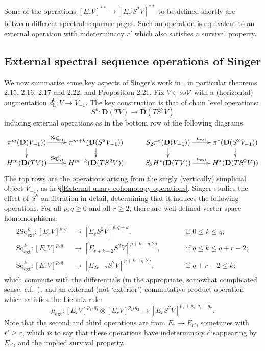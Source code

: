 \documentclass[11pt]{amsart} \renewcommand{\baselinestretch}{1.2}
\theoremstyle{plain}
\numberwithin{equation}{section} %
\theoremstyle{plain}
\numberwithin{equation}{chapter} %
\renewcommand{\to}{\longrightarrow}
\newcommand{\calV}{\mathcal{V}}
\newcommand{\vect}[2]{\calV^{#1}_{#2}}
\newcommand{\ExtCohOp}{\mathrm{Sq}_\mathrm{ext}}
\newcommand{\ExtCohProd}{\mu_\mathrm{ext}}
\newcommand{\Edown}[4]{[E_{#1}#2]^{#3}_{#4}}
\newcommand{\dhor}{_\mathrm{h}}
\newcommand{\dual}{\mathbf{D}}
\newcommand{\SubsectionOrSection}[1]{\subsection{#1}}
\begin{document}
\begin{Operations in composite functor spectral sequences}
Some of the operations $\Edown{r}{V}{**}{}\to \Edown{r'}{S^2V}{**}{}$ to be defined shortly are between different spectral sequence pages. 
Such an operation is equivalent to an external operation with indeterminacy $r'$ which also satisfies a survival property.

\SubsectionOrSection{External spectral sequence operations of Singer}\label{singer ext ops sect}
We now summarise some key aspects of Singer's work in \cite{MR2245560}, in particular theorems 2.15, 2.16, 2.17 and 2.22, and Proposition 2.21. Fix $V\in ss\vect{}{}$ with a (horizontal) augmentation $d\dhor^0:V\to V_{-1}$. The key construction is that of chain level operations:
\[S^k:\dual (TV)\to \dual (TS^2V)\]
inducing external operations as in the bottom row of the following diagrams:
\[\xymatrix@R=4mm{
\pi^{m}(\dual(V_{-1}))\ar[r]^-{\ExtCohOp^k}
\ar[d]%
&%
\pi^{m+k}(\dual(S^2V_{-1}))\ar[d]%
&%
S_2\pi^{*}(\dual(V_{-1}))\ar[r]^-{\ExtCohProd}
\ar[d]%
&%
\pi^{*}(\dual(S^2V_{-1}))\ar[d]%
\\%
H^{m}(\dual(TV))\ar[r]^-{\ExtCohOp^k}
&%
H^{m+k}(\dual(TS^2V))
&%
S_2H^{*}(\dual(TV))\ar[r]^-{\ExtCohProd}
&%
H^{*}(\dual(TS^2V))
}\]
The top rows are the operations arising from the singly (vertically) simplicial object $V_{-1}$, as in \S\ref{External unary cohomotopy operations}. Singer studies the effect of $S^k$ on filtration in detail, determining that it induces the following operations.
For all $p,q\geq0$ and all $r\geq2$, there are well-defined vector space homomorphisms:
\begin{alignat*}{2}
\ExtCohOp^k:\Edown{r}{V}{p,q}{}&\to \Edown{r}{S^2V}{p,q+k}{},&\qquad&\text{if }0\leq k \leq q;\\
\ExtCohOp^k:\Edown{r}{V}{p,q}{}&\to \Edown{r+k-2}{S^2V}{p+k-q,2q}{},&\qquad&\text{if }q\leq k\leq q+r-2;\\
\ExtCohOp^k:\Edown{r}{V}{p,q}{}&\to \Edown{2r-2}{S^2V}{p+k-q,2q}{},&\qquad&\text{if }q+r-2\leq k;
\end{alignat*}
which commute with the differentials (in the appropriate, somewhat complicated sense, c.f.\ \cite[Theorem 2.17]{MR2245560}), and an external (not `exterior') commutative product operation which satisfies the Liebniz rule:
\[\ExtCohProd:\Edown{r}{V}{p_1,q_1}{}\otimes \Edown{r}{V}{p_2,q_2}{}\to \Edown{r}{S^2V}{p_1+p_2,q_1+q_2}{}.\]
Note that the second and third operations are from $E_r\to E_{r'}$, sometimes with $r'\geq r$, which is to say that these operations have indeterminacy disappearing by $E_{r'}$, and the implied survival property.


\end{Operations in composite functor spectral sequences}
\end{document}
